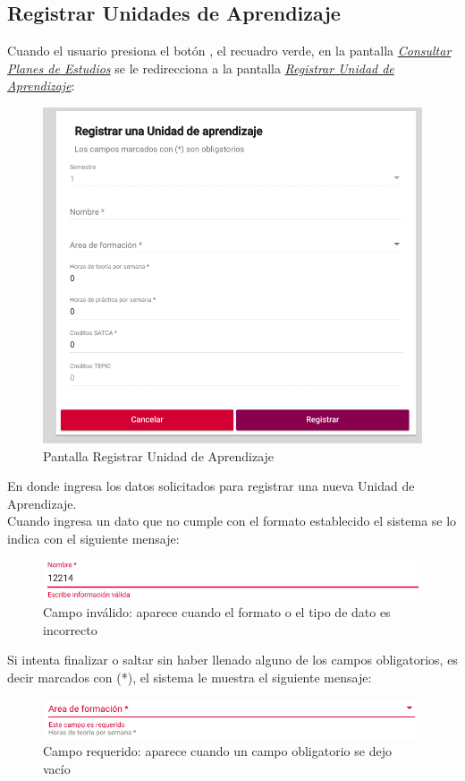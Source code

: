 \subsection{Registrar Unidades de Aprendizaje}
Cuando el usuario presiona el botón \IUbutton{+}, el recuadro verde, en la pantalla \hyperlink{consultarUA}{\textit{Consultar Planes de Estudios}} se le redirecciona a la pantalla \hyperlink{registrarUA}{\textit{Registrar Unidad de Aprendizaje}}:\\
\begin{figure}[H]
    \centering
    \hypertarget{registrarUA}{\includegraphics[width=0.7\linewidth]{images/GUA/registrarUA}}
    \caption{Pantalla Registrar Unidad de Aprendizaje}
    \label{registrarUA}
\end{figure}
\newpage
En donde ingresa los datos solicitados para registrar una nueva Unidad de Aprendizaje.\\
Cuando ingresa un dato que no cumple con el formato establecido el sistema se lo indica con el siguiente mensaje:\\
\begin{figure}[H]
    \centering
    \hypertarget{invalidoR}{\includegraphics[width=0.7\linewidth]{images/GUA/invalido}}
    \caption{Campo inválido: aparece cuando el formato o el tipo de dato es incorrecto}
    \label{invalidoR}
\end{figure}
Si intenta finalizar o saltar sin haber llenado alguno de los campos  obligatorios, es decir marcados con (*), el sistema le muestra el siguiente mensaje:\\
\begin{figure}[H]
    \centering
    \hypertarget{requeridoR}{\includegraphics[width=0.7\linewidth]{images/GUA/requerido}}
    \caption{Campo requerido: aparece cuando un campo obligatorio se dejo vacío}
    \label{requeridoR}
\end{figure}
